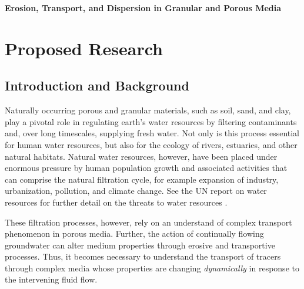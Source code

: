 \documentclass[11pt]{article}
\begin{document}
\begin{center}
{\large \bf Erosion, Transport, and Dispersion in Granular
and Porous Media} 
\end{center}


\section{Proposed Research} 

\subsection{Introduction and Background} 

	Naturally occurring porous and granular materials, such as soil, sand, and clay, play a pivotal role in regulating earth's water resources by filtering contaminants and, over long timescales, supplying fresh water. Not only is this process essential for human water resources, but also for the ecology of rivers, estuaries, and other natural habitats. Natural water resources, however, have been placed under enormous pressure by human population growth and associated activities that can comprise the natural filtration cycle, for example expansion of industry, urbanization, pollution, and climate change. See the UN report on water resources for further detail on the threats to water resources \cite{UNwater}.

	These filtration processes, however, rely on an understand of complex transport phenomenon in porous media. Further, the action of continually flowing groundwater can alter medium properties through erosive and transportive processes. Thus, it becomes necessary to understand the transport of tracers through complex media whose properties are changing {\em dynamically} in response to the intervening fluid flow.
	
\end{document}
